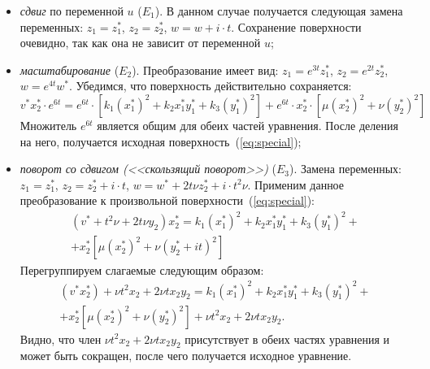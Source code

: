 \documentclass[../main.tex]{subfiles}
\begin{document}
\begin{itemize}
\item \textit{сдвиг} по переменной $u$ ($E_1$). В данном случае получается следующая замена переменных: $z_1 = z_1^*$, $z_2 = z_2^*$, $w = w + i\cdot t$. Сохранение поверхности очевидно, так как она не зависит от переменной $u$;

\item \textit{масштабирование} ($E_2$). Преобразование имеет вид: $z_1 = e^{3t} z_1^*$, $z_2 = e^{2t} z_2^*$, $w = e^{4t} w^*$. Убедимся, что поверхность действительно сохраняется:
\begin{equation*}
v^* x_2^* \cdot e^{6t} = e^{6t} \cdot\left[k_1 (x_1^*)^2 + k_2 x_1^* y_1^* + k_3 (y_1^*)^2\right] + e^{6t}\cdot x_2^* \cdot\left[\mu (x_2^*)^2 + \nu (y_2^*)^2\right]
\end{equation*}
Множитель $e^{6t}$ является общим для обеих частей уравнения. После деления на него, получается исходная поверхность~(\ref{eq:special});

\item \textit{поворот со сдвигом (<<скользящий поворот>>)} ($E_3$). Замена переменных: $z_1 = z_1^*$, $z_2 = z_2^* + i\cdot t$, $w = w^* + 2t\nu z_2^* + i\cdot t^2 \nu$. Применим данное преобразование к произвольной поверхности~(\ref{eq:special}):
\begin{multline*}
\left(v^* + t^2 \nu + 2 t \nu y_2\right) x_2^* = k_1 (x_1^*)^2 + k_2 x_1^* y_1^* + k_3 (y_1^*)^2 +\\
+ x_2^* \left[\mu (x_2^*)^2 + \nu \left(y_2^* + i t\right)^2\right]
\end{multline*}
Перегруппируем слагаемые следующим образом:
\begin{multline*}
\left(v^* x_2^*\right) + \nu t^2 x_2 + 2\nu t x_2 y_2 = k_1 (x_1^*)^2 + k_2 x_1^* y_1^* + k_3 (y_1^*)^2 + \\
+ x_2^* \left[\mu (x_2^*)^2 + \nu \left(y_2^*\right)^2\right] + \nu t^2 x_2 + 2\nu t x_2 y_2.
\end{multline*}
Видно, что член $\nu t^2 x_2 + 2\nu t x_2 y_2$ присутствует в обеих частях уравнения и может быть сокращен, после чего получается исходное уравнение.
\end{itemize}
\end{document}
